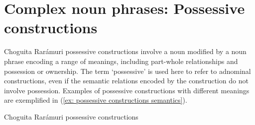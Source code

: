 \section{Complex noun phrases: Possessive constructions}
\label{sec: complex noun phrases}






Choguita Rarámuri possessive constructions involve a noun modified by a noun phrase encoding a range of meanings, including part-whole relationships and possession or ownership. The term `possessive' is used here to refer to adnominal constructions, even if the semantic relations encoded by the construction do not involve possession. Examples of possessive constructions with different meanings are exemplified in (\ref{ex: possessive constructions semantics}).

\ea\label{ex: possessive constructions semantics}
{Choguita Rarámuri possessive constructions}

